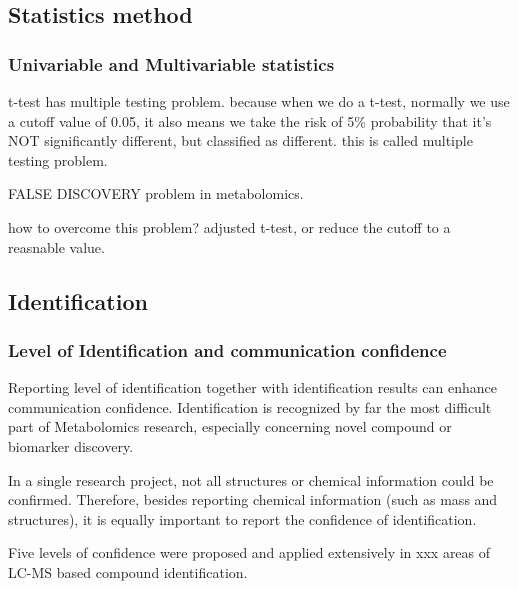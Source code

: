 
\subsection{Statistics method}
\subsubsection{Univariable and Multivariable statistics}
t-test has multiple testing problem. because when we do a t-test, normally we use a cutoff value of 0.05, it also means we take the risk of 5\% probability that it's NOT significantly different, but classified as different. this is called multiple testing problem. 

FALSE DISCOVERY problem in metabolomics.

how to overcome this problem? adjusted t-test, or reduce the cutoff to a reasnable value.

\subsection{Identification}
\subsubsection{Level of Identification and communication confidence}
Reporting level of identification together with identification results can enhance communication confidence. Identification is recognized by far the most difficult part of Metabolomics research, especially concerning novel compound or biomarker discovery. 

In a single research project, not all structures or chemical information could be confirmed. Therefore, besides reporting chemical information (such as mass and structures), it is equally important to report the confidence of identification.

Five levels of confidence were proposed and applied extensively in xxx areas of LC-MS based compound identification\cite{?}.

